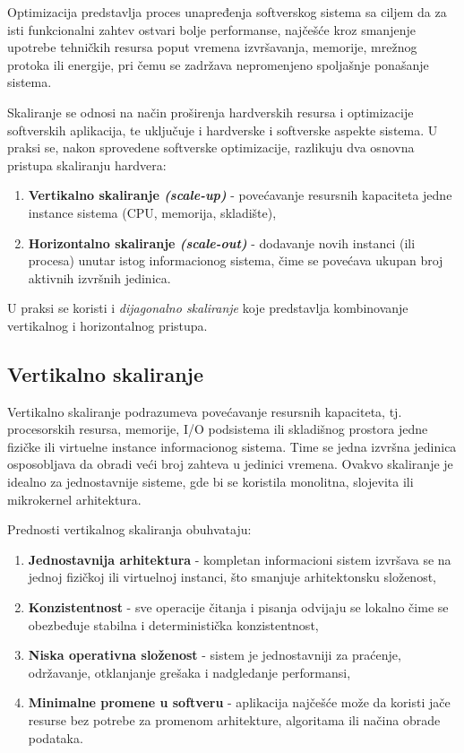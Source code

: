 \begin{definicija}
Optimizacija predstavlja proces unapređenja softverskog sistema sa ciljem da za isti funkcionalni zahtev ostvari bolje performanse, najčešće kroz smanjenje upotrebe tehničkih resursa poput vremena izvršavanja, memorije, mrežnog protoka ili energije, pri čemu se zadržava nepromenjeno spoljašnje ponašanje sistema.
\end{definicija}

Skaliranje se odnosi na način proširenja hardverskih resursa i optimizacije softverskih aplikacija, te uključuje i hardverske i softverske aspekte sistema. U praksi se, nakon sprovedene softverske optimizacije, razlikuju dva osnovna pristupa skaliranju hardvera:
\begin{enumerate}
\item \textbf{Vertikalno skaliranje \textit{(scale-up)}} - povećavanje resursnih kapaciteta jedne instance sistema (CPU, memorija, skladište),
\item \textbf{Horizontalno skaliranje \textit{(scale-out)}} - dodavanje novih instanci (ili procesa) unutar istog informacionog sistema, čime se povećava ukupan broj aktivnih izvršnih jedinica.
\end{enumerate}

U praksi se koristi i \textit{dijagonalno skaliranje} koje predstavlja kombinovanje vertikalnog i horizontalnog pristupa.

\subsection{Vertikalno skaliranje}
Vertikalno skaliranje podrazumeva povećavanje resursnih kapaciteta, tj. procesorskih resursa, memorije, I/O podsistema ili skladišnog prostora jedne fizičke ili virtuelne instance informacionog sistema. Time se jedna izvršna jedinica osposobljava da obradi veći broj zahteva u jedinici vremena. Ovakvo skaliranje je idealno za jednostavnije sisteme, gde bi se koristila monolitna, slojevita ili mikrokernel arhitektura.

Prednosti vertikalnog skaliranja obuhvataju:
\begin{enumerate}
\item \textbf{Jednostavnija arhitektura} - kompletan informacioni sistem izvršava se na jednoj fizičkoj ili virtuelnoj instanci, što smanjuje arhitektonsku složenost,
\item \textbf{Konzistentnost} - sve operacije čitanja i pisanja odvijaju se lokalno čime se obezbeđuje stabilna i deterministička konzistentnost,
\item \textbf{Niska operativna složenost} - sistem je jednostavniji za praćenje, održavanje, otklanjanje grešaka i nadgledanje performansi,
\item \textbf{Minimalne promene u softveru} - aplikacija najčešće može da koristi jače resurse bez potrebe za promenom arhitekture, algoritama ili načina obrade podataka.
\end{enumerate}

